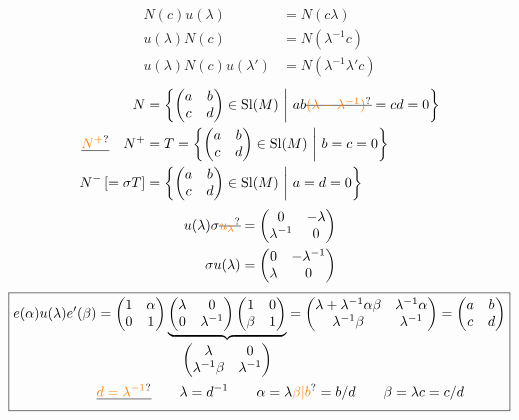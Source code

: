\[\begin{aligned}
N(c)u(\lambda)&=N(c\lambda)\\u(\lambda)N(c)&=N(\lambda^{-1}c)\\u(\lambda)N(c)u(\lambda')&=N(\lambda^{-1}\lambda'c)
\end{aligned}\]
\[\begin{aligned}
N&=\left\{\begin{pmatrix}a&b\\c&d\end{pmatrix}\in\mathrm{Sl}(M)\ \middle|\ ab\deleted{\unsure{(\lambda-\lambda^{-1})}}=cd=0\right\}\\
\deleted{\unsure{N^+}}\quad N^+&=T=\left\{\begin{pmatrix}a&b\\c&d\end{pmatrix}\in\mathrm{Sl}(M)\ \middle|\ b=c=0\right\}\\
N^-\,[=\sigma T]&=\left\{\begin{pmatrix}a&b\\c&d\end{pmatrix}\in\mathrm{Sl}(M)\ \middle|\ a=d=0\right\}
\end{aligned}\]
\[\begin{aligned}u(\lambda)\sigma\deleted{\unsure{u_\lambda}}&=\begin{pmatrix}0&-\lambda\\\lambda^{-1}&0\end{pmatrix}\\\sigma u(\lambda)&=\begin{pmatrix}0&-\lambda^{-1}\\\lambda&0\end{pmatrix}\end{aligned}\]
\[\boxed{\begin{aligned}
e(\alpha)u(\lambda)e'(\beta)&=\begin{pmatrix}1&\alpha\\0&1\end{pmatrix}\underbrace{\begin{pmatrix}\lambda&0\\0&\lambda^{-1}\end{pmatrix}\begin{pmatrix}1&0\\\beta&1\end{pmatrix}}_{\begin{pmatrix}\lambda&0\\\lambda^{-1}\beta&\lambda^{-1}\end{pmatrix}}=\begin{pmatrix}\lambda+\lambda^{-1}\alpha\beta&\lambda^{-1}\alpha\\\lambda^{-1}\beta&\lambda^{-1}\end{pmatrix}=\begin{pmatrix}a&b\\c&d\end{pmatrix}\\
&\deleted{\unsure{d=\lambda^{-1}}}\qquad \lambda=d^{-1}\qquad \alpha=\lambda\unsure{\beta|b}=b/d\qquad \beta=\lambda c=c/d
\end{aligned}}\]
